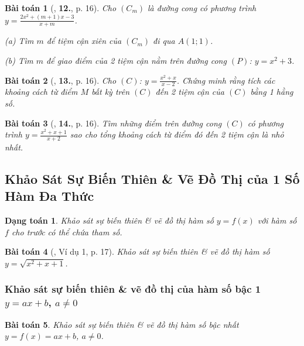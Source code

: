 \documentclass[12pt]{article}
\numberwithin{equation}{section}
\newtheorem{dangtoan}{Dạng toán}[section]
\newtheorem{baitoan}{Bài toán}[section]
\begin{document}
\begin{baitoan}[\cite{TL_chuyen_Toan_Giai_Tich_12}, \textbf{12.}, p. 16]
	Cho $(C_m)$ là đường cong có phương trình $y = \frac{2x^2 + (m + 1)x - 3}{x + m}$.
	\begin{enumerate*}
		\item[(a)] Tìm $m$ để tiệm cận xiên của $(C_m)$ đi qua $A(1;1)$.
		\item[(b)] Tìm $m$ để giao điểm của 2 tiệm cận nằm trên đường cong $(P)$: $y = x^2 + 3$.
	\end{enumerate*}
\end{baitoan}

\begin{baitoan}[\cite{TL_chuyen_Toan_Giai_Tich_12}, \textbf{13.}, p. 16]
	Cho $(C)$: $y = \frac{x^2 + x}{x - 2}$. Chứng minh rằng tích các khoảng cách từ điểm $M$ bất kỳ trên $(C)$ đến 2 tiệm cận của $(C)$ bằng 1 hằng số.
\end{baitoan}

\begin{baitoan}[\cite{TL_chuyen_Toan_Giai_Tich_12}, \textbf{14.}, p. 16]
	Tìm những điểm trên đường cong $(C)$ có phương trình $y = \frac{x^2 + x + 1}{x + 2}$ sao cho tổng khoảng cách từ điểm đó đến 2 tiệm cận là nhỏ nhất.
\end{baitoan}



\subsection{Khảo Sát Sự Biến Thiên \& Vẽ Đồ Thị của 1 Số Hàm Đa Thức}

\begin{dangtoan}
		Khảo sát sự biến thiên \& vẽ đồ thị hàm số $y = f(x)$ với hàm số $f$ cho trước có thể chứa tham số.
\end{dangtoan}

\begin{baitoan}[\cite{TL_chuyen_Toan_Giai_Tich_12}, Ví dụ 1, p. 17]
	Khảo sát sự biến thiên \& vẽ đồ thị hàm số $y = \sqrt{x^2 + x + 1}$.
\end{baitoan}

\subsubsection{Khảo sát sự biến thiên \& vẽ đồ thị của hàm số bậc 1 $y = ax + b$, $a\ne 0$}

\begin{baitoan}
	Khảo sát sự biến thiên \& vẽ đồ thị hàm số bậc nhất $y = f(x) = ax + b$, $a\ne 0$.
\end{baitoan}
\end{document}
